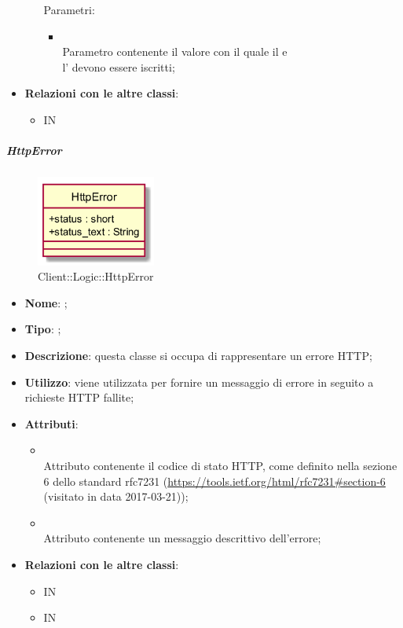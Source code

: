 \begin{itemize}
\begin{itemize}
		Parametri:
		\begin{itemize}
			\item {} \\
			Parametro contenente il valore con il quale il  e \\ l' devono essere iscritti;
		\end{itemize}
	\end{itemize}
	\item \textbf{Relazioni con le altre classi}:
	\begin{itemize}
		\item IN \hyperlink{Logic_label}{}
	\end{itemize}
\end{itemize}
\FloatBarrier

\hypertarget{HttpError_label}{\subparagraph{HttpError}}
\begin{figure}[h]
	\centering
	\includegraphics[width=0.35\textwidth,height=\textheight,keepaspectratio]{images/ClassHttpError.png}
	\caption{Client::Logic::HttpError}
\end{figure}
\begin{itemize}
	\item \textbf{Nome}: ;
	\item \textbf{Tipo}: ;
	\item \textbf{Descrizione}: questa classe si occupa di rappresentare un errore HTTP;
	\item \textbf{Utilizzo}: viene utilizzata per fornire un messaggio di errore in seguito a richieste HTTP fallite;
	\item \textbf{Attributi}:
	\begin{itemize}
		\item[]  \\
		Attributo contenente il codice di stato HTTP, come definito nella sezione 6 dello standard rfc7231 (\url{https://tools.ietf.org/html/rfc7231#section-6}  (visitato in data 2017-03-21));
		\item[]  \\
		Attributo contenente un messaggio descrittivo dell'errore;
	\end{itemize}
	\item \textbf{Relazioni con le altre classi}:
	\begin{itemize}
		\item IN \hyperlink{HttpPromise_label}{}
		\item IN \hyperlink{Logic_label}{}
	\end{itemize}
\end{itemize}
\FloatBarrier

